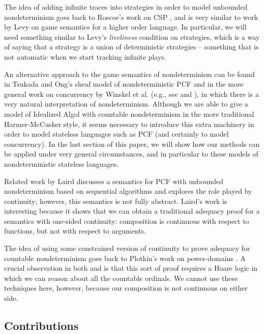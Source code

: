\documentclass[sigplan,9pt,review]{acmart}\settopmatter{printfolios=true,printccs=false,printacmref=false}
\begin{document}
The idea of adding infinite traces into strategies in order to model unbounded nondeterminism goes back to Roscoe's work on CSP \cite{RoscoeCspInfinite}, and is very similar to work by Levy \cite{LevyGsInfinite} on game semantics for a higher order language.  
In particular, we will need something similar to Levy's \emph{liveliness} condition on strategies, which is a way of saying that a strategy is a union of deterministic strategies -- something that is not automatic when we start tracking infinite plays.  

An alternative approach to the game semantics of nondeterminism can be found in Tsukada and Ong's sheaf model of nondeterministic PCF \cite{TsukadaSheaves} and in the more general work on concurrency by Winskel et al. (e.g., see \cite{StrategiesAsProfunctors} and \cite{ConcurrentHylandOngGames}), in which there is a very natural interpretation of nondeterminism.  
Although we are able to give a model of Idealized Algol with countable nondeterminism in the more traditional Harmer-McCusker style, it seems necessary to introduce this extra machinery in order to model stateless languages such as PCF (and certainly to model concurrency).  
In the last section of this paper, we will show how our methods can be applied under very general circumstances, and in particular to these models of nondeterministic stateless languages.

Related work by Laird \cite{LairdOrdinalGames,FunctionalProgramsAsCoroutines} discusses a semantics for PCF with unbounded nondeterminism based on sequential algorithms and explores the role played by continuity; however, this semantics is not fully abstract.  
Laird's work is interesting because it shows that we can obtain a traditional adequacy proof for a semantics with one-sided continuity: composition is continuous with respect to functions, but not with respect to arguments.  

The idea of using some constrained version of continuity to prove adequacy for countable nondeterminism goes back to Plotkin's work on power-domains \cite{PlotkinApt}.
A crucial observation in both \cite{PlotkinApt} and \cite{LairdOrdinalGames} is that this sort of proof requires a Hoare logic in which we can reason about all the countable ordinals.
We cannot use these techniques here, however, because our composition is not continuous on either side.

\subsection{Contributions}
\end{document}
